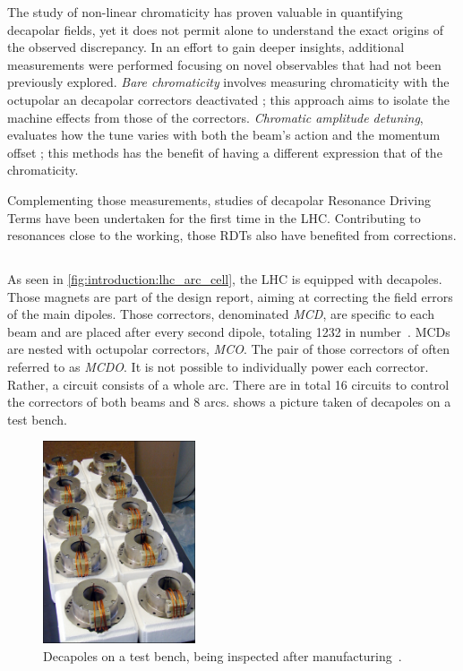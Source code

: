 The study of non-linear chromaticity has proven valuable in quantifying decapolar fields, yet it
does not permit alone to understand the exact origins of the observed discrepancy. In an effort to
gain deeper insights, additional measurements were performed focusing on novel observables that had
not been previously explored.
\textit{Bare chromaticity} involves measuring chromaticity with
the octupolar an decapolar correctors deactivated ; this approach aims to isolate the machine
effects from those of the correctors.
\textit{Chromatic amplitude detuning}, evaluates how the tune varies with both the beam's action and
the momentum offset ; this methods has the benefit of having a different expression that of the
chromaticity.

Complementing those measurements, studies of decapolar Resonance Driving Terms have been undertaken
for the first time in the LHC. Contributing to resonances close to the working, those RDTs also have
benefited from corrections.


\subsection{}

As seen in \cref{fig:introduction:lhc_arc_cell}, the LHC is equipped with decapoles. Those magnets
are part of the design report, aiming at correcting the field errors of the main dipoles.
Those correctors, denominated \textit{MCD}, are specific to each beam and are placed after every
second dipole, totaling 1232 in number~\cite{venturini_delsolaro_magnetic_2005}.
MCDs are nested with octupolar correctors, \textit{MCO}. The pair of those correctors of often
referred to as \textit{MCDO}. 
It is not possible to individually power each corrector. Rather, a circuit consists of a whole arc.
There are in total 16 circuits to control the correctors of both beams and 8 arcs.
 shows a picture taken of decapoles on a test bench.

\begin{figure}
    \centering
    \includegraphics[width=0.4\textwidth]{./images/decapoles_real_pic.jpg}
    \caption{Decapoles on a test bench, being inspected after
    manufacturing~\cite{noauthor_ten_2001}.}
    \label{fig:decapoles:decapole_picture}
\end{figure}


